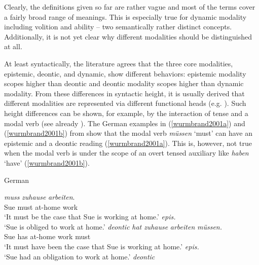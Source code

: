 Clearly, the definitions given so far are rather vague and most of the terms cover a fairly broad range of meanings. This is especially true for dynamic modality including volition and ability -- two semantically rather distinct concepts. Additionally, it is not yet clear why different modalities should be distinguished at all. 


At least syntactically, the literature agrees that the three core modalities, epistemic, deontic, and dynamic, show different behaviors: epistemic modality scopes higher than deontic and deontic modality scopes higher than dynamic modality. From these differences in syntactic height, it is usually derived that different modalities are represented via different functional heads (e.g. \citealt{cinque1999adverbs, wurmbrand2001finitive, butler2003minimalist}). Such height differences can be shown, for example, by the interaction of tense and a modal verb (see already \citealt{groenendijk1975modality}). The German examples in (\ref{wurmbrand2001a}) and (\ref{wurmbrand2001b}) from \citet[184]{wurmbrand2001finitive} show that the modal verb \textit{müssen} `must' can have an epistemic and a deontic reading (\ref{wurmbrand2001a}). This is, however, not true when the modal verb is under the scope of an overt tensed auxiliary like \textit{haben} `have' (\ref{wurmbrand2001b}). 



\begin{exe} 
\ex German \citep[184]{wurmbrand2001finitive}
\begin{xlist} 
\ex {} {\textit{muss}} {\textit{zuhause}} {\textit{arbeiten}.}\\
{\textcolor{white}{\cmark}Sue} {must} {at-home} {work}\\
\trans \cmark`It must be the case that Sue is working at home.' \hfill{\textit{epis.}}\\
\cmark `Sue is obliged to work at home.' \hfill{\textit{deontic}}\label{wurmbrand2001a}
\ex {} {\textit{hat}} {\textit{zuhause}} {\textit{arbeiten}} {\textit{müssen.}}  \\
{\textcolor{white}{\cmark}Sue} {has} {at-home} {work} {must} \\
\trans \xmark `It must have been the case that Sue is working at home.' \hfill{\textit{epis.}} \\
\cmark `Sue had an obligation to work at home.' \hfill{\textit{deontic}}\label{wurmbrand2001b} 
\end{xlist} 
\end{exe} 

